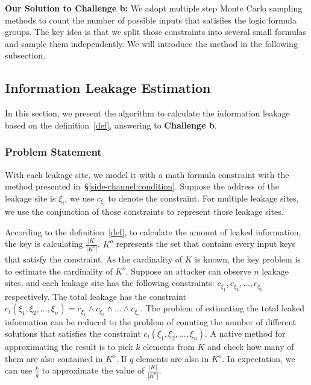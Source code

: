 \vspace*{6pt}
\textbf{Our Solution to Challenge b:}
We adopt multiple step Monte Carlo sampling methods to count the number of possible inputs
that satisfies the logic formula groups. The key idea is that 
we split those constraints into several small formulas and sample them independently.  
We will introduce the method in the following subsection.

\subsection{Information Leakage Estimation}

\newcommand{\addr}[1]{{l}_{#1}}
\renewcommand{\addr}[1]{{\gamma}_{#1}}
\renewcommand{\addr}[1]{{\zeta}_{#1}}
\renewcommand{\addr}[1]{{\xi}_{#1}}

In this section, we present the algorithm to calculate the information
leakage based on the definition~\ref{def}, answering to
\textbf{Challenge b}. 

\subsubsection{Problem Statement}
With each leakage site, we model it with a math formula constraint with the method 
presented in~\S\ref{side-channel:condition}.
Suppose the address of the leakage site is $\addr{i}$,
we use $c_{\addr{i}}$ to denote the constraint. For multiple leakage sites, 
we use the conjunction of those constraints to represent those leakage sites. 

According to the definition~\ref{def}, to calculate the amount of leaked 
information, the key is calculating $\frac{|K|}{|K^o|}$. $K^o$ represents
the set that contains every input keys that satisfy the constraint. As the 
cardinality of $K$ is known, the key problem is to estimate the cardinality of
$K^o$. Suppose an attacker can observe $n$ leakage sites, and each leakage site has
the following constraints: $c_{\addr{1}}, c_{\addr{2}}, \ldots, c_{\addr{n}}$ respectively. 
The total leakage has the constraint 
$c_t({\addr{1}},{\addr{2}},\ldots,{\addr{n}}) = c_{\addr{1}} \land c_{\addr{2}} 
\land \ldots \land c_{\addr{n}}$. The problem of estimating the total leaked information 
can be reduced to the problem of counting the number of different solutions 
that satisfies the constraint $c_t({\addr{1}},{\addr{2}},\ldots,{\addr{n}})$. 
A native method for approximating 
the result is to pick $k$ elements from $K$ and check how many of them are also
contained in $K^o$. If $q$ elements are also in $K^o$. In expectation, we can
use $\frac{k}{q}$ to approximate the value of $\frac{|K|}{|K^o|}$.

